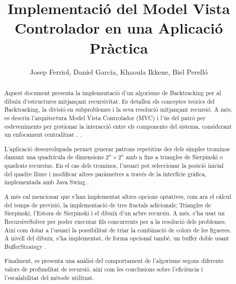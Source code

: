 \documentclass{ieeetj}
\begin{document}

\title{Implementació del Model Vista Controlador en una Aplicació Pràctica}

\author{Josep Ferriol, Daniel García, Khaoula Ikkene, Biel Perelló}  

\begin{abstract} 
Aquest document presenta la implementació d'un algorisme de Backtracking per al dibuix d'estructures mitjançant recursivitat. Es detallen els conceptes teòrics del Backtracking, la divisió en subproblemes i la seva resolució mitjançant recursió. A més, es descriu l'arquitectura Model Vista Controlador (MVC) i l'ús del patró per esdeveniments per gestionar la interacció entre els components del sistema, considerant un enfocament centralitzat \cite{Backtracking}, \cite{EventPattern}.

L'aplicació desenvolupada permet generar patrons repetitius des dels simples trominos damunt una quadrícula de dimensions \( 2^n \times 2^n \) amb n fins a triangles de Sierpinski o quadrats recursius. En el cas dels trominos, l'usuari pot seleccionar la posició inicial del quadre lliure i modificar altres paràmetres a través de la interfície gràfica, implementada amb Java Swing \cite{SwingLibrary}.\newline
\newline

A més cal mencionar que s'han implementat altres opcions optatives, com ara el càlcul del temps de previsió, la implementació de tres fractals adicionals; Triangles de Sierpinski, l'Estora de Sierpinski i el dibuix d'un arbre recursiu. 
A més, s'ha usat un RecursiveSolver per poder executar fils concurrents per a la resolució dels problemes. Així com dotar a l'usuari la possibilitat de triar la combinació de colors de les figueres. 
A nivell del dibuix, s'ha implementat, de forma opcional també, un buffer doble usant BufferStrategy \cite{oracle_bufferstrategy}.\newline

Finalment, es presenta una anàlisi del comportament de l'algorisme segons diferents valors de profunditat de recursió, així com les conclusions sobre l'eficiència i l'escalabilitat del mètode utilitzat.
\end{abstract}
\end{document}

